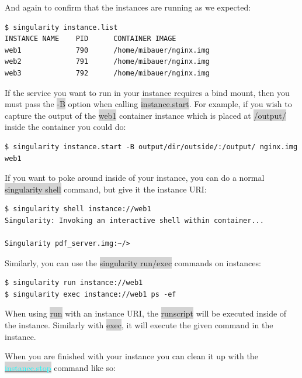 \documentclass[a4paper]{article}
\begin{document}
And again to confirm that the instances are running as we expected:

\begin{lstlisting}[frame=single]  
$ singularity instance.list
INSTANCE NAME    PID      CONTAINER IMAGE
web1             790      /home/mibauer/nginx.img
web2             791      /home/mibauer/nginx.img
web3             792      /home/mibauer/nginx.img
\end{lstlisting}

If the service you want to run in your instance requires a bind mount, then you must pass the \colorbox{lightgray}{-B} option when calling \colorbox{lightgray}{instance.start}. For example, if you wish to capture the output of the \colorbox{lightgray}{web1} container instance which is placed at \colorbox{lightgray}{/output/} inside the container you could do:

\begin{lstlisting}[frame=single]  
$ singularity instance.start -B output/dir/outside/:/output/ nginx.img  web1
\end{lstlisting}

If you want to poke around inside of your instance, you can do a normal \colorbox{lightgray}{singularity shell} command, but give it the instance URI:

\begin{lstlisting}[frame=single] 
$ singularity shell instance://web1
Singularity: Invoking an interactive shell within container...

Singularity pdf_server.img:~/>  
\end{lstlisting}

Similarly, you can use the \colorbox{lightgray}{singularity run/exec} commands on instances:

\begin{lstlisting}[frame=single]  
$ singularity run instance://web1
$ singularity exec instance://web1 ps -ef

\end{lstlisting}

When using \colorbox{lightgray}{run} with an instance URI, the \colorbox{lightgray}{runscript} will be executed inside of the instance. Similarly with \colorbox{lightgray}{exec}, it will execute the given command in the instance.

When you are finished with your instance you can clean it up with the \colorbox{lightgray}{\hyperref[sec:instancestop]{{\textcolor{cyan}{instance.stop}}}} command like so:
\end{document}
